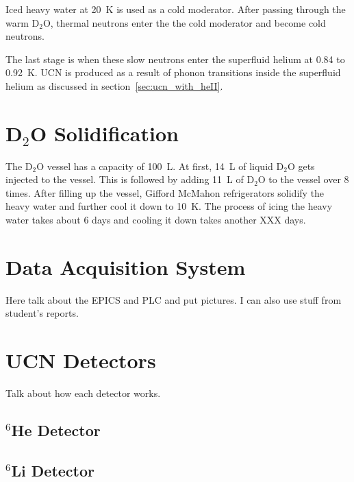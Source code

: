 Iced heavy water at 20~K is used as a cold moderator. After passing
through the warm D$_2$O, thermal neutrons enter the the cold moderator
and become cold neutrons.

The last stage is when these slow neutrons enter the superfluid helium
at 0.84 to 0.92~K. UCN is produced as a result of phonon transitions
inside the superfluid helium as discussed in section~\ref{sec:ucn_with_heII}.


\section{D$_2$O Solidification}
The D$_2$O vessel has a capacity of 100~L. At first, 14~L of liquid
D$_2$O gets injected to the vessel. This is followed by adding 11~L of
D$_2$O to the vessel over 8 times.  After filling up the vessel,
Gifford McMahon refrigerators solidify the heavy water and further
cool it down to 10~K. The process of icing the heavy water takes about
6 days and cooling it down takes another XXX days.

\section{Data Acquisition System}
Here talk about the EPICS and PLC and put pictures. I can also use
stuff from student's reports.

\section{UCN Detectors}
Talk about how each detector works.
\subsection{$^6$He Detector}
\subsection{$^6$Li Detector}




